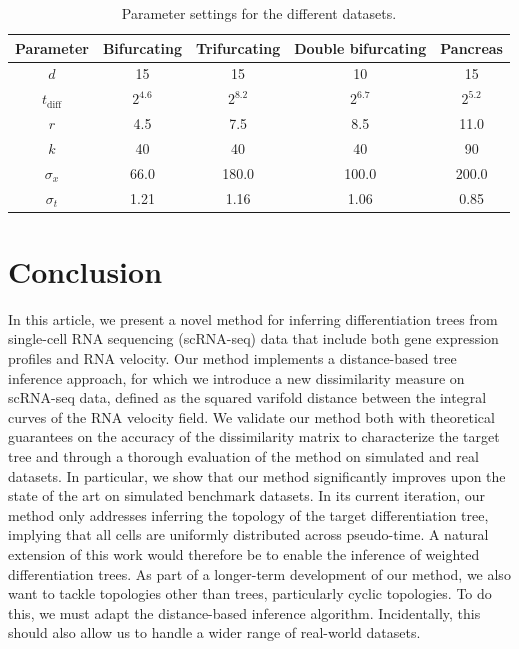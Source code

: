 \documentclass[pdflatex,sn-mathphys-num]{sn-jnl}%
\theoremstyle{thmstyleone}%
\theoremstyle{thmstyletwo}%
\theoremstyle{thmstylethree}%
\begin{document}
\begin{table}[!h]
    \begin{tabular}{|ccccc|}
        \hline
        Parameter & Bifurcating & Trifurcating & Double bifurcating & Pancreas\\
        \hline
        $d$ & 15 & 15 & 10 & 15 \\
        $t_{\text{diff}}$ & $2^{4.6}$ & $2^{8.2}$ & $2^{6.7}$ & $2^{5.2}$ \\
        $r$ & 4.5 & 7.5 & 8.5 & 11.0 \\
        $k$ & 40 & 40 & 40 & 90 \\
        $\sigma_x$ & 66.0 & 180.0 & 100.0 & 200.0 \\
        $\sigma_t$ & 1.21 & 1.16 & 1.06 & 0.85 \\
        \hline
    \end{tabular}
    \caption{Parameter settings for the different datasets.} \label{tab:parameters}
    \vspace{-1.3cm}
\end{table}



\section{Conclusion}\label{sec:conclusion}
In this article, we present a novel method for inferring differentiation trees from single-cell RNA sequencing (scRNA-seq) data that include both gene expression profiles and RNA velocity. Our method implements a distance-based tree inference approach, for which we introduce a new dissimilarity measure on scRNA-seq data, defined as the squared varifold distance between the integral curves of the RNA velocity field. We validate our method both with theoretical guarantees on the accuracy of the dissimilarity matrix to characterize the target tree and through a thorough evaluation of the method on simulated and real datasets. In particular, we show that our method significantly improves upon the state of the art on simulated benchmark datasets. In its current iteration, our method only addresses inferring the topology of the target differentiation tree, implying that all cells are uniformly distributed across pseudo-time. A natural extension of this work would therefore be to enable the inference of weighted differentiation trees. As part of a longer-term development of our method, we also want to tackle topologies other than trees, particularly cyclic topologies. To do this, we must adapt the distance-based inference algorithm. Incidentally, this should also allow us to handle a wider range of real-world datasets. 
\end{document}
